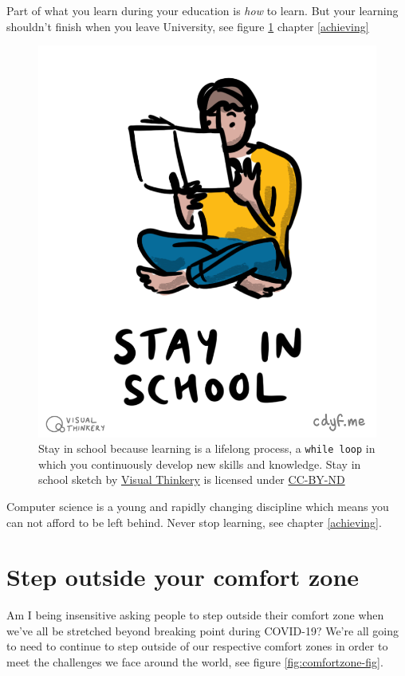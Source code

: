 \documentclass[
]{book}
\begin{document}
Part of what you learn during your education is \emph{how} to learn. But your learning shouldn't finish when you leave University, see figure \ref{fig:stayinschool-fig} chapter \ref{achieving}

\begin{figure}

{\centering \includegraphics[width=0.5\linewidth]{images/Stay in school} 

}

\caption{Stay in school because learning is a lifelong process, a \texttt{while\ loop} in which you continuously develop new skills and knowledge. Stay in school sketch by \href{https://visualthinkery.com}{Visual Thinkery} is licensed under \href{https://creativecommons.org/licenses/by-nd/4.0/}{CC-BY-ND}}\label{fig:stayinschool-fig}
\end{figure}



Computer science is a young and rapidly changing discipline which means you can not afford to be left behind. Never stop learning, see chapter \ref{achieving}.

\hypertarget{comfy}{%
\section{Step outside your comfort zone}\label{comfy}}

Am I being insensitive asking people to step outside their comfort zone when we've all be stretched beyond breaking point during COVID-19? We're all going to need to continue to step outside of our respective comfort zones in order to meet the challenges we face around the world, see figure \ref{fig:comfortzone-fig}.
\end{document}
